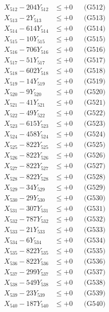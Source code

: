 \documentclass[a4paper,10pt]{article}
\begin{document}
{\begin{align}
X_{512} - 204Y_{512} &\leq +0 && \text{(G512)} \\
X_{513} - 2Y_{513} &\leq +0 && \text{(G513)} \\
X_{514} - 614Y_{514} &\leq +0 && \text{(G514)} \\
X_{515} - 10Y_{515} &\leq +0 && \text{(G515)} \\
X_{516} - 706Y_{516} &\leq +0 && \text{(G516)} \\
X_{517} - 51Y_{517} &\leq +0 && \text{(G517)} \\
X_{518} - 602Y_{518} &\leq +0 && \text{(G518)} \\
X_{519} - 14Y_{519} &\leq +0 && \text{(G519)} \\
X_{520} - 9Y_{520} &\leq +0 && \text{(G520)} \\
\allowbreak
X_{521} - 41Y_{521} &\leq +0 && \text{(G521)} \\
X_{522} - 49Y_{522} &\leq +0 && \text{(G522)} \\
X_{523} - 615Y_{523} &\leq +0 && \text{(G523)} \\
X_{524} - 458Y_{524} &\leq +0 && \text{(G524)} \\
X_{525} - 822Y_{525} &\leq +0 && \text{(G525)} \\
X_{526} - 822Y_{526} &\leq +0 && \text{(G526)} \\
X_{527} - 822Y_{527} &\leq +0 && \text{(G527)} \\
X_{528} - 822Y_{528} &\leq +0 && \text{(G528)} \\
X_{529} - 34Y_{529} &\leq +0 && \text{(G529)} \\
X_{530} - 29Y_{530} &\leq +0 && \text{(G530)} \\
\allowbreak
X_{531} - 307Y_{531} &\leq +0 && \text{(G531)} \\
X_{532} - 787Y_{532} &\leq +0 && \text{(G532)} \\
X_{533} - 21Y_{533} &\leq +0 && \text{(G533)} \\
X_{534} - 6Y_{534} &\leq +0 && \text{(G534)} \\
X_{535} - 822Y_{535} &\leq +0 && \text{(G535)} \\
X_{536} - 822Y_{536} &\leq +0 && \text{(G536)} \\
X_{537} - 299Y_{537} &\leq +0 && \text{(G537)} \\
X_{538} - 549Y_{538} &\leq +0 && \text{(G538)} \\
X_{539} - 23Y_{539} &\leq +0 && \text{(G539)} \\
X_{540} - 187Y_{540} &\leq +0 && \text{(G540)} \\

\end{align}}
\end{document}
